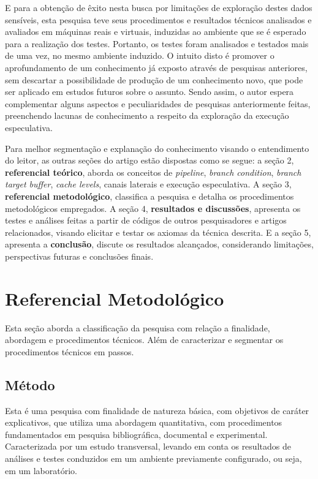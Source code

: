 \documentclass[
	article,			    %
	12pt,				    %
	oneside,			    %
	a4paper,			    %
	chapter=TITLE,		    %
	section=TITLE,		    %
	subsection=TITLE,	    %
	english,			    %
	brazil,				    %
	sumario=tradicional
]{abntex2}
\begin{document}
E para a obtenção de êxito nesta busca por limitações de exploração destes dados sensíveis, esta pesquisa teve seus procedimentos e resultados técnicos analisados e avaliados em máquinas reais e virtuais, induzidas ao ambiente que se é esperado para a realização dos testes. Portanto, os testes foram analisados e testados mais de uma vez, no mesmo ambiente induzido. O intuito disto é promover o aprofundamento de um conhecimento já exposto através de pesquisas anteriores, sem descartar a possibilidade de produção de um conhecimento novo, que pode ser aplicado em estudos futuros sobre o assunto. Sendo assim, o autor espera complementar alguns aspectos e peculiaridades de pesquisas anteriormente feitas, preenchendo lacunas de conhecimento a respeito da exploração da execução especulativa.

Para melhor segmentação e explanação do conhecimento visando o entendimento do leitor, as outras seções do artigo estão dispostas como se segue: a seção 2, \textbf{referencial teórico}, aborda os conceitos de \emph{pipeline}, \emph{branch condition}, \emph{branch target buffer}, \emph{cache levels}, canais laterais e execução especulativa. A seção 3, \textbf{referencial metodológico}, classifica a pesquisa e detalha os procedimentos metodológicos empregados. A seção 4, \textbf{resultados e discussões}, apresenta os testes e análises feitas a partir de códigos de outros pesquisadores e artigos relacionados, visando elicitar e testar os axiomas da técnica descrita. E a seção 5, apresenta a \textbf{conclusão}, discute os resultados alcançados, considerando limitações, perspectivas futuras e conclusões finais.

\section{Referencial Metodológico}
Esta seção aborda a classificação da pesquisa com relação a finalidade, abordagem e procedimentos técnicos. Além de caracterizar e segmentar os procedimentos técnicos em passos.
\subsection{Método}
Esta é uma pesquisa com finalidade de natureza básica, com objetivos de caráter explicativos, que utiliza uma abordagem quantitativa, com procedimentos fundamentados em pesquisa bibliográfica, documental e experimental. Caracterizada por um estudo transversal, levando em conta os resultados de análises e testes conduzidos em um ambiente previamente configurado, ou seja, em um laboratório.
\end{document}
